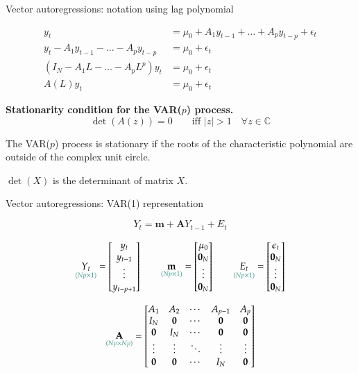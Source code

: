 \documentclass[notes,blackandwhite,mathsans,usenames,dvipsnames]{beamer}
\begin{document}
\begin{frame}{Vector autoregressions: notation using lag polynomial}

\begin{align*}
y_t &= \mu_0 + A_1 y_{t-1} + \dots + A_p y_{t-p} + \epsilon_t\\
y_t - A_1 y_{t-1} - \dots - A_p y_{t-p} &= \mu_0 + \epsilon_t\\
\left(I_N - A_1 L - \dots - A_p L^p\right)y_t &= \mu_0 + \epsilon_t\\
A\left(L\right)y_t &= \mu_0 + \epsilon_t
\end{align*}

\bigskip\textbf{Stationarity condition for the VAR($p$) process.}
$$ \det\left(A\left(z\right)\right) = 0  \qquad \text{iff }|z|> 1 \quad\forall z\in\mathbb{C} $$

{\color{mcxs2}The} VAR($p$) {\color{mcxs2}process is {\color{mcxs1}stationary} if the roots of the characteristic polynomial are outside of the complex unit circle.}

\bigskip$\det(X)$ {\color{mcxs2}is the determinant of matrix} $X$.

\end{frame}



\begin{frame}{Vector autoregressions: VAR(1) representation}

$$ Y_t = \mathbf{m} + \mathbf{A} Y_{t-1} + E_t $$

$$ \underset{\color{mcxs2}(Np\times 1)}{Y_t} = \begin{bmatrix} y_t \\ y_{t-1} \\ \vdots \\ y_{t-p+1} \end{bmatrix} \qquad \underset{\color{mcxs2}(Np\times 1)}{\mathbf{m}} = \begin{bmatrix} \mu_0 \\ \mathbf{0}_N \\ \vdots \\ \mathbf{0}_N \end{bmatrix} \qquad \underset{\color{mcxs2}(Np\times 1)}{E_t} = \begin{bmatrix} \epsilon_t \\ \mathbf{0}_N \\ \vdots \\ \mathbf{0}_N \end{bmatrix}$$


$$ \underset{\color{mcxs2}(Np\times Np)}{\mathbf{A}} = \begin{bmatrix} A_1 & A_2 & \cdots & A_{p-1} & A_p \\ I_N & \mathbf{0} & \cdots & \mathbf{0} & \mathbf{0} \\ \mathbf{0} & I_N & \cdots & \mathbf{0} & \mathbf{0} \\ \vdots & \vdots & \ddots & \vdots & \vdots \\ \mathbf{0} & \mathbf{0} & \cdots & I_N & \mathbf{0}  \end{bmatrix}  $$

\end{frame}
\end{document}
